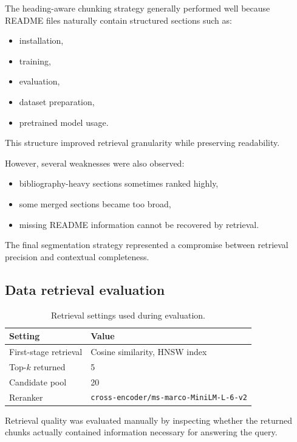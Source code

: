 \documentclass[11pt,a4paper]{article}
\begin{document}
The heading-aware chunking strategy generally performed well because README files naturally contain structured sections such as:

\begin{itemize}
  \item installation,
  \item training,
  \item evaluation,
  \item dataset preparation,
  \item pretrained model usage.
\end{itemize}

This structure improved retrieval granularity while preserving readability.

However, several weaknesses were also observed:

\begin{itemize}
  \item bibliography-heavy sections sometimes ranked highly,
  \item some merged sections became too broad,
  \item missing README information cannot be recovered by retrieval.
\end{itemize}

The final segmentation strategy represented a compromise between retrieval precision and contextual completeness.

\subsection{Data retrieval evaluation}

\begin{table}[ht]
\centering
\small
\begin{tabular}{ll}
\toprule
Setting & Value \\
\midrule
First-stage retrieval & Cosine similarity, HNSW index \\
Top-\(k\) returned & 5 \\
Candidate pool & 20 \\
Reranker & \texttt{cross-encoder/ms-marco-MiniLM-L-6-v2} \\
\bottomrule
\end{tabular}
\caption{Retrieval settings used during evaluation.}
\label{tab:retrieval}
\end{table}

Retrieval quality was evaluated manually by inspecting whether the returned chunks actually contained information necessary for answering the query.
\end{document}
